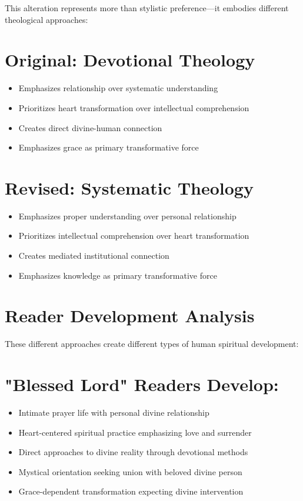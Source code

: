 \documentclass[11pt,twoside]{book}
\begin{document}
This alteration represents more than stylistic preference—it embodies different theological approaches:
\section*{Original: Devotional Theology}
\label{sec:orgd10bb2b}
\begin{itemize}
\item Emphasizes relationship over systematic understanding
\item Prioritizes heart transformation over intellectual comprehension
\item Creates direct divine-human connection
\item Emphasizes grace as primary transformative force
\end{itemize}
\section*{Revised: Systematic Theology}
\label{sec:org0f35f70}
\begin{itemize}
\item Emphasizes proper understanding over personal relationship
\item Prioritizes intellectual comprehension over heart transformation
\item Creates mediated institutional connection
\item Emphasizes knowledge as primary transformative force
\end{itemize}
\section*{Reader Development Analysis}
\label{sec:org775133b}

These different approaches create different types of human spiritual development:
\section*{"Blessed Lord" Readers Develop:}
\label{sec:org8cbc48c}
\begin{itemize}
\item Intimate prayer life with personal divine relationship
\item Heart-centered spiritual practice emphasizing love and surrender
\item Direct approaches to divine reality through devotional methods
\item Mystical orientation seeking union with beloved divine person
\item Grace-dependent transformation expecting divine intervention
\end{itemize}
\end{document}
